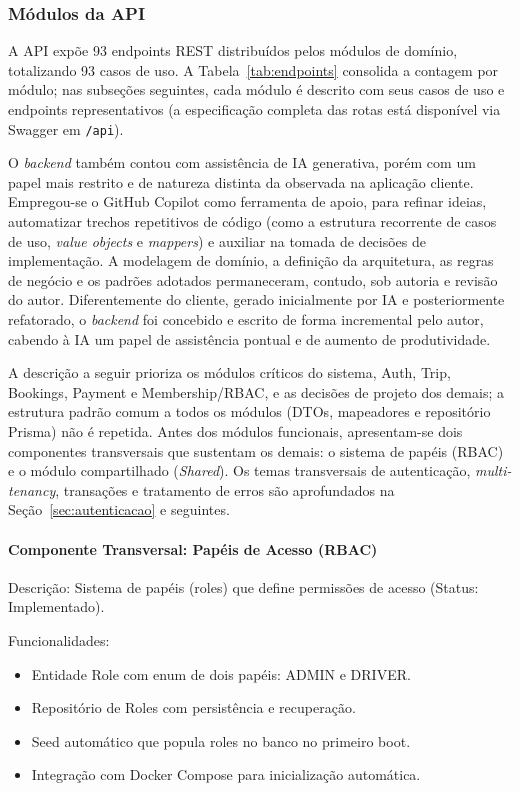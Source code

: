 \subsubsection{Módulos da API}

A API expõe 93 endpoints REST distribuídos pelos módulos de domínio, totalizando 93 casos de uso. A Tabela~\ref{tab:endpoints} consolida a contagem por módulo; nas subseções seguintes, cada módulo é descrito com seus casos de uso e endpoints representativos (a especificação completa das rotas está disponível via Swagger em \texttt{/api}).

O \textit{backend} também contou com assistência de IA generativa, porém com um papel mais restrito e de natureza distinta da observada na aplicação cliente. Empregou-se o GitHub Copilot como ferramenta de apoio, para refinar ideias, automatizar trechos repetitivos de código (como a estrutura recorrente de casos de uso, \textit{value objects} e \textit{mappers}) e auxiliar na tomada de decisões de implementação. A modelagem de domínio, a definição da arquitetura, as regras de negócio e os padrões adotados permaneceram, contudo, sob autoria e revisão do autor. Diferentemente do cliente, gerado inicialmente por IA e posteriormente refatorado, o \textit{backend} foi concebido e escrito de forma incremental pelo autor, cabendo à IA um papel de assistência pontual e de aumento de produtividade.



A descrição a seguir prioriza os módulos críticos do sistema, Auth, Trip, Bookings, Payment e Membership/RBAC, e as decisões de projeto dos demais; a estrutura padrão comum a todos os módulos (DTOs, mapeadores e repositório Prisma) não é repetida. Antes dos módulos funcionais, apresentam-se dois componentes transversais que sustentam os demais: o sistema de papéis (RBAC) e o módulo compartilhado (\textit{Shared}). Os temas transversais de autenticação, \textit{multi-tenancy}, transações e tratamento de erros são aprofundados na Seção~\ref{sec:autenticacao} e seguintes.

\paragraph{Componente Transversal: Papéis de Acesso (RBAC)}

Descrição: Sistema de papéis (roles) que define permissões de acesso (Status: Implementado).

Funcionalidades:
\begin{itemize}
\item Entidade Role com enum de dois papéis: ADMIN e DRIVER.
\item Repositório de Roles com persistência e recuperação.
\item Seed automático que popula roles no banco no primeiro boot.
\item Integração com Docker Compose para inicialização automática.
\end{itemize}

